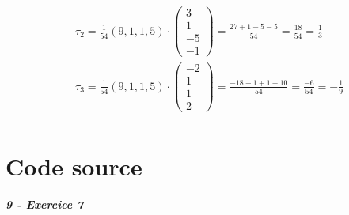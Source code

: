 \documentclass[11pt,a4paper]{report}
\newcommand{\matdddd}[4]{\begin{pmatrix}#1\\#2\\#3\\#4\end{pmatrix}}
\begin{document}
\begin{align*}
& \tau_2 = \frac{1}{54} (9,1,1,5) \cdot \matdddd{3}{1}{-5}{-1} = \frac{27+1-5-5}{54} = \frac{18}{54} = \frac{1}{3} \\
& \tau_3 = \frac{1}{54} (9,1,1,5) \cdot \matdddd{-2}{1}{1}{2} = \frac{-18+1+1+10}{54} = \frac{-6}{54} = -\frac{1}{9} \\
\end{align*}

\chapter{Code source}

\paragraph{9 - Exercice 7}
\end{document}
